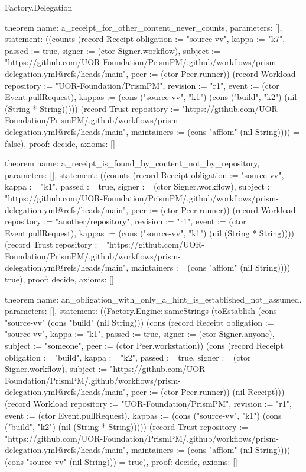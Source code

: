 \begin{lexlean}{Factory.Delegation}
\begin{semanticmodule}
theorem{
  name: a_receipt_for_other_content_never_counts,
  parameters: [],
  statement: ((counts (record Receipt {obligation := "source-vv", kappa := "k7", passed := true, signer := (ctor Signer.workflow), subject := "https://github.com/UOR-Foundation/PrismPM/.github/workflows/prism-delegation.yml@refs/heads/main", peer := (ctor Peer.runner)}) (record Workload {repository := "UOR-Foundation/PrismPM", revision := "r1", event := (ctor Event.pullRequest), kappas := (cons ("source-vv", "k1") (cons ("build", "k2") (nil (String * String))))}) (record Trust {repository := "https://github.com/UOR-Foundation/PrismPM/.github/workflows/prism-delegation.yml@refs/heads/main", maintainers := (cons "afflom" (nil String))})) = false),
  proof: decide{},
  axioms: []
}

theorem{
  name: a_receipt_is_found_by_content_not_by_repository,
  parameters: [],
  statement: ((counts (record Receipt {obligation := "source-vv", kappa := "k1", passed := true, signer := (ctor Signer.workflow), subject := "https://github.com/UOR-Foundation/PrismPM/.github/workflows/prism-delegation.yml@refs/heads/main", peer := (ctor Peer.runner)}) (record Workload {repository := "another/repository", revision := "r1", event := (ctor Event.pullRequest), kappas := (cons ("source-vv", "k1") (nil (String * String)))}) (record Trust {repository := "https://github.com/UOR-Foundation/PrismPM/.github/workflows/prism-delegation.yml@refs/heads/main", maintainers := (cons "afflom" (nil String))})) = true),
  proof: decide{},
  axioms: []
}

theorem{
  name: an_obligation_with_only_a_hint_is_established_not_assumed,
  parameters: [],
  statement: ((Factory.Engine::sameStrings (toEstablish (cons "source-vv" (cons "build" (nil String))) (cons (record Receipt {obligation := "source-vv", kappa := "k1", passed := true, signer := (ctor Signer.anyone), subject := "someone", peer := (ctor Peer.workstation)}) (cons (record Receipt {obligation := "build", kappa := "k2", passed := true, signer := (ctor Signer.workflow), subject := "https://github.com/UOR-Foundation/PrismPM/.github/workflows/prism-delegation.yml@refs/heads/main", peer := (ctor Peer.runner)}) (nil Receipt))) (record Workload {repository := "UOR-Foundation/PrismPM", revision := "r1", event := (ctor Event.pullRequest), kappas := (cons ("source-vv", "k1") (cons ("build", "k2") (nil (String * String))))}) (record Trust {repository := "https://github.com/UOR-Foundation/PrismPM/.github/workflows/prism-delegation.yml@refs/heads/main", maintainers := (cons "afflom" (nil String))})) (cons "source-vv" (nil String))) = true),
  proof: decide{},
  axioms: []
}


\end{semanticmodule}
\end{lexlean}
